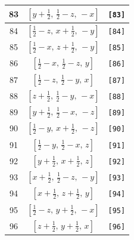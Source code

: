 \documentclass[fleqn,8pt]{jsarticle}
\begin{document}
\begin{longtable}{ccc}
83 & $\left[ y + \frac{1}{2},\, \frac{1}{2} - z,\, - x \right]$ & {\tt [83]} \\ \hline
84 & $\left[ \frac{1}{2} - z,\, x + \frac{1}{2},\, - y \right]$ & {\tt [84]} \\ \hline
85 & $\left[ \frac{1}{2} - x,\, z + \frac{1}{2},\, - y \right]$ & {\tt [85]} \\ \hline
86 & $\left[ \frac{1}{2} - x,\, \frac{1}{2} - z,\, y \right]$ & {\tt [86]} \\ \hline
87 & $\left[ \frac{1}{2} - z,\, \frac{1}{2} - y,\, x \right]$ & {\tt [87]} \\ \hline
88 & $\left[ z + \frac{1}{2},\, \frac{1}{2} - y,\, - x \right]$ & {\tt [88]} \\ \hline
89 & $\left[ y + \frac{1}{2},\, \frac{1}{2} - x,\, - z \right]$ & {\tt [89]} \\ \hline
90 & $\left[ \frac{1}{2} - y,\, x + \frac{1}{2},\, - z \right]$ & {\tt [90]} \\ \hline
91 & $\left[ \frac{1}{2} - y,\, \frac{1}{2} - x,\, z \right]$ & {\tt [91]} \\ \hline
92 & $\left[ y + \frac{1}{2},\, x + \frac{1}{2},\, z \right]$ & {\tt [92]} \\ \hline
93 & $\left[ x + \frac{1}{2},\, \frac{1}{2} - z,\, - y \right]$ & {\tt [93]} \\ \hline
94 & $\left[ x + \frac{1}{2},\, z + \frac{1}{2},\, y \right]$ & {\tt [94]} \\ \hline
95 & $\left[ \frac{1}{2} - z,\, y + \frac{1}{2},\, - x \right]$ & {\tt [95]} \\ \hline
96 & $\left[ z + \frac{1}{2},\, y + \frac{1}{2},\, x \right]$ & {\tt [96]} \\
\end{longtable}
\end{document}
